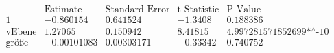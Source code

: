 \[\begin{array}{l|llll}
 \text{} & \text{Estimate} & \text{Standard Error} & \text{t-Statistic} & \text{P-Value} \\
\hline
 1 & -0.860154 & 0.641524 & -1.3408 & 0.188386 \\
 \text{vEbene} & 1.27065 & 0.150942 & 8.41815 & \text{4.997281571852699$\grave{ }$*${}^{\wedge}$-10} \\
 \text{gr{\" o}{\ss}e} & -0.00101083 & 0.00303171 & -0.33342 & 0.740752 \\
\end{array}\]

